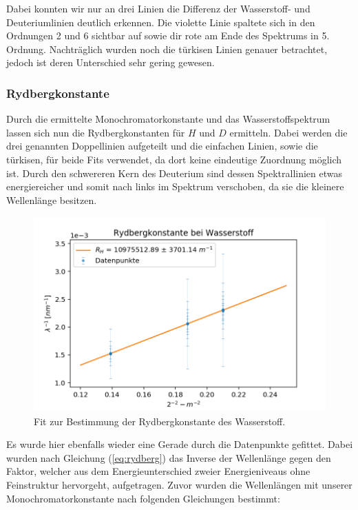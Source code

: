 \documentclass[]{article}
\begin{document}
Dabei konnten wir nur an drei Linien die Differenz der Wasserstoff- und Deuteriumlinien deutlich erkennen. Die violette Linie spaltete sich in den Ordnungen 2 und 6 sichtbar auf sowie dir rote am Ende des Spektrums in 5. Ordnung. Nachträglich wurden noch die türkisen Linien genauer betrachtet, jedoch ist deren Unterschied sehr gering gewesen.

\subsubsection{Rydbergkonstante}
Durch die ermittelte Monochromatorkonstante und das Wasserstoffspektrum lassen sich nun die Rydbergkonstanten für $H$ und $D$ ermitteln. Dabei werden die drei genannten Doppellinien aufgeteilt und die einfachen Linien, sowie die türkisen, für beide Fits verwendet, da dort keine eindeutige Zuordnung möglich ist. Durch den schwereren Kern des Deuterium sind dessen Spektrallinien etwas energiereicher und somit nach links im Spektrum verschoben, da sie die kleinere Wellenlänge besitzen. 

\begin{figure}[!h]
\centering
\includegraphics[width=1\textwidth]{Plots/R_H.png}
\caption{ Fit zur Bestimmung der Rydbergkonstante des Wasserstoff.}
\label{fig:Rydberg H}
\end{figure}

Es wurde hier ebenfalls wieder eine Gerade durch die Datenpunkte gefittet. Dabei wurden nach Gleichung (\ref{eq:rydberg}) das Inverse der Wellenlänge gegen den Faktor, welcher aus dem Energieunterschied zweier Energieniveaus ohne Feinstruktur hervorgeht, aufgetragen. Zuvor wurden die Wellenlängen mit unserer Monochromatorkonstante nach folgenden Gleichungen bestimmt:
\end{document}
